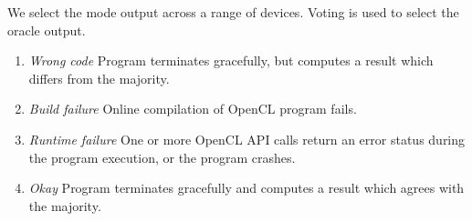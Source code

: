 We select the mode output across a range of devices. Voting is used to select the oracle output.
%
\begin{enumerate}
	\item \emph{Wrong code} Program terminates gracefully, but computes a result which differs from the majority.
	\item \emph{Build failure} Online compilation of OpenCL program fails.
	\item \emph{Runtime failure} One or more OpenCL API calls return an error status during the program execution, or the program crashes.
	\item \emph{Okay} Program terminates gracefully and computes a result which agrees with the majority.
\end{enumerate}
